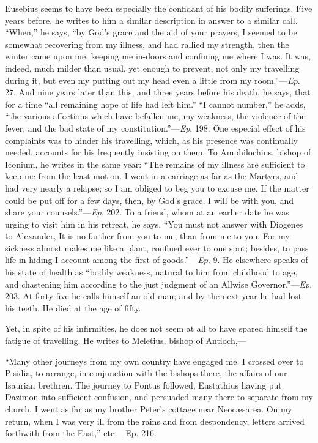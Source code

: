 Eusebius seems to have been especially the confidant of his bodily
sufferings. Five years before, he writes to him a similar
description in answer to a similar call. ``When,'' he says,
``by God's grace and the aid of your prayers, I seemed to be
somewhat recovering from my illness, and had rallied my strength, then
the winter came upon me, keeping me in-doors and confining me where I
was. It was, indeed, much milder than usual, yet enough to prevent,
not only my travelling during it, but even my putting out my head even
a little from my room.''—\emph{Ep}. 27. And nine years later
than this, and three years before his death, he says, that for a time
``all remaining hope of life had left him.'' ``I cannot
number,'' he adds, ``the various affections which have
befallen me, my weakness, the violence of the fever, and the bad state
of my constitution.''—\emph{Ep}. 198. One especial effect of his
complaints was to hinder his travelling, which, as his presence was
continually needed, accounts for his frequently insisting on them. To
Amphilochius, bishop of Iconium, he writes in the same year: ``The
remains of my illness are sufficient to keep me from the least motion.
I went in a carriage as far as the Martyrs, and had very nearly a
relapse; so I am obliged to beg you to excuse me. If the matter could
be put off for a few days, then, by God's grace, I will be with you,
and share your counsels.''—\emph{Ep}. 202. To a friend, whom at
an earlier date he was urging to visit him in his retreat, he says,
``You must not answer with Diogenes to Alexander, It is no farther
from you to me, than from me to you. For my sickness almost makes me
like a plant, confined ever to one spot; besides, to pass life in
hiding I account among the first of goods.''—\emph{Ep}. 9. He
elsewhere speaks of his state of health as ``bodily weakness,
natural to him from childhood to age, and chastening him according to
the just judgment of an Allwise Governor.''—\emph{Ep}. 203. At
forty-five he calls himself an old man; and by the next year he
had lost his teeth. He died at the age of fifty.

Yet, in spite of his infirmities, he does not seem at all to have
spared himself the fatigue of travelling. He writes to Meletius,
bishop of Antioch,—

``Many other journeys from my own country have engaged me. I
crossed over to Pisidia, to arrange, in conjunction with the bishops
there, the affairs of our Isaurian brethren. The journey to Pontus
followed, Eustathius having put Dazimon into sufficient confusion, and
persuaded many there to separate from my church. I went as far as my
brother Peter's cottage near Neocæsarea. On my return, when I was
very ill from the rains and from despondency, letters arrived
forthwith from the East,'' etc.—Ep. 216.

